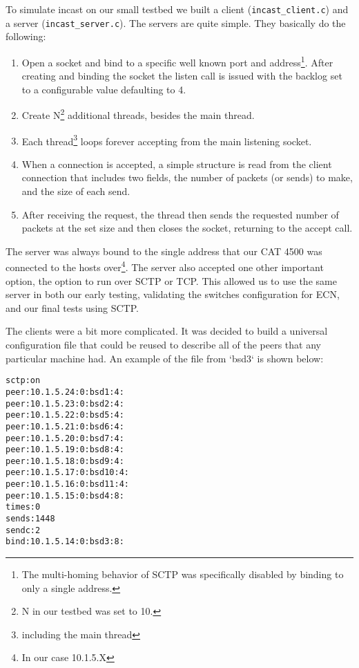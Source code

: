 \documentclass[12pt]{article}
\begin{document}
To simulate incast on our small testbed we built a client (\texttt{incast\_client.c}) and a server (\texttt{incast\_server.c}).
The servers are quite simple. They basically do the following:
\begin{enumerate}

\item Open a socket and bind to a specific well known port and address\footnote{The multi-homing
behavior of SCTP was specifically disabled by binding to only a single address.}. After creating and
binding the socket the listen call is issued with the backlog set to a configurable value defaulting to 4.

\item Create N\footnote{N in our testbed was set to 10.} additional threads, besides the main thread.

\item Each thread\footnote{including the main thread} loops forever accepting from the main listening socket.

\item When a connection is accepted, a simple structure is read from the client connection that includes two fields, the
number of packets (or sends) to make, and the size of each send.

\item After receiving the request, the thread then sends the requested number of packets at the set
size and then closes the socket, returning to the accept call.

\end{enumerate}

The server
was always bound to the single address that our CAT 4500 was connected to the hosts over\footnote{In our case 10.1.5.X}.
The server also accepted one other important option, the option to run over SCTP or TCP. This allowed us to use
the same server in both our early testing, validating the switches configuration for ECN, and our final tests
using SCTP.

The clients were a bit more complicated. It was decided to build a universal 
configuration file that could be reused to describe all of the peers that any
particular machine had. An example of the file from `bsd3` is shown below:
\begin{verbatim}
sctp:on
peer:10.1.5.24:0:bsd1:4:
peer:10.1.5.23:0:bsd2:4:
peer:10.1.5.22:0:bsd5:4:
peer:10.1.5.21:0:bsd6:4:
peer:10.1.5.20:0:bsd7:4:
peer:10.1.5.19:0:bsd8:4:
peer:10.1.5.18:0:bsd9:4:
peer:10.1.5.17:0:bsd10:4:
peer:10.1.5.16:0:bsd11:4:
peer:10.1.5.15:0:bsd4:8:
times:0
sends:1448
sendc:2
bind:10.1.5.14:0:bsd3:8:
\end{verbatim}
\end{document}

